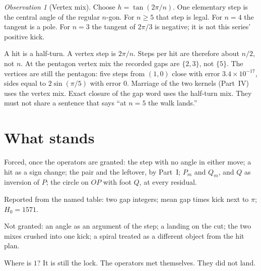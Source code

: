 \documentclass[10pt,a4paper]{article}
\theoremstyle{plain}
\theoremstyle{definition}
\theoremstyle{remark}
\newtheorem{observation}{Observation}
\begin{document}
\begin{observation}[Vertex mix]
Choose \(h=\tan(2\pi/n)\).
One elementary step is the central angle of the regular \(n\)-gon.
For \(n\ge 5\) that step is legal.
For \(n=4\) the tangent is a pole.
For \(n=3\) the tangent of \(2\pi/3\) is negative; it is not this series' positive kick.
\end{observation}

A hit is a half-turn.
A vertex step is \(2\pi/n\).
Steps per hit are therefore about \(n/2\), not \(n\).
At the pentagon vertex mix the recorded gaps are \(\{2,3\}\), not \(\{5\}\).
The vertices are still the pentagon: five steps from \((1,0)\) close with error \(3.4\times 10^{-17}\), sides equal to \(2\sin(\pi/5)\) with error \(0\).
Marriage of the two kernels (Part~IV) uses the vertex mix.
Exact closure of the gap word uses the half-turn mix.
They must not share a sentence that says ``at \(n=5\) the walk lands.''

\section{What stands}

Forced, once the operators are granted:
the step with no angle in either move;
a hit as a sign change;
the pair and the leftover, by Part~I;
\(P_m\) and \(Q_m\), and \(Q\) as inversion of \(P\);
the circle on \(OP\) with foot \(Q\), at every residual.

Reported from the named table:
two gap integers;
mean gap times kick next to \(\pi\);
\(H_0=1571\).

Not granted:
an angle as an argument of the step;
a landing on the cut;
the two mixes crushed into one kick;
a spiral treated as a different object from the hit plan.

Where is \(1\)?
It is still the lock.
The operators met themselves.
They did not land.
\end{document}
